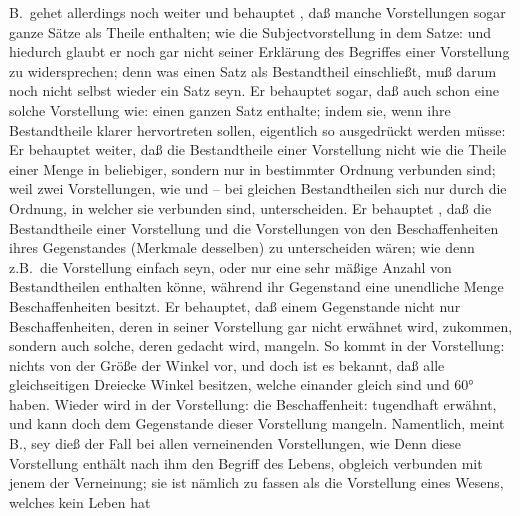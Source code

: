 B.\ gehet allerdings noch weiter und behauptet , daß manche Vorstellungen sogar ganze Sätze als Theile enthalten; wie die Subjectvorstellung in dem Satze:  und hiedurch glaubt er noch gar nicht seiner Erklärung des Begriffes einer Vorstellung zu widersprechen; denn was einen Satz als Bestandtheil einschließt, muß darum noch nicht selbst wieder ein Satz seyn. Er behauptet sogar, daß auch schon eine solche Vorstellung wie:  einen ganzen Satz enthalte; indem sie, wenn ihre Bestandtheile klarer hervortreten sollen, eigentlich so ausgedrückt werden müsse:  Er behauptet weiter, daß die Bestandtheile einer Vorstellung nicht wie die Theile einer Menge in beliebiger, sondern nur in bestimmter Ordnung verbunden sind; weil zwei Vorstellungen, wie  und  -- bei gleichen Bestandtheilen sich nur durch die Ordnung, in welcher sie verbunden sind, unterscheiden. Er behauptet , daß die Bestandtheile einer Vorstellung und die Vorstellungen von den Beschaffenheiten ihres Gegenstandes (Merkmale desselben) zu unterscheiden wären; wie denn z.B.\ die Vorstellung einfach seyn, oder nur eine sehr mäßige Anzahl von Bestandtheilen enthalten könne, während ihr Gegenstand eine unendliche Menge Beschaffenheiten besitzt. Er behauptet, daß einem Gegenstande nicht nur Beschaffenheiten, deren in seiner Vorstellung gar nicht erwähnet wird, zukommen, sondern auch solche, deren gedacht wird, mangeln. So kommt in der Vorstellung:  nichts von der Größe der Winkel vor, und doch ist es bekannt, daß alle gleichseitigen Dreiecke Winkel besitzen, welche einander gleich sind und 60° haben. Wieder wird in der Vorstellung:  die Beschaffenheit: tugendhaft erwähnt, und kann doch dem Gegenstande dieser Vorstellung mangeln. Namentlich, meint B., sey dieß der Fall bei allen verneinenden Vorstellungen, wie  Denn diese Vorstellung enthält nach ihm den Begriff des  Lebens, obgleich verbunden mit jenem der Verneinung; sie ist nämlich zu fassen als die Vorstellung eines Wesens, welches kein Leben hat \usw\ \par
